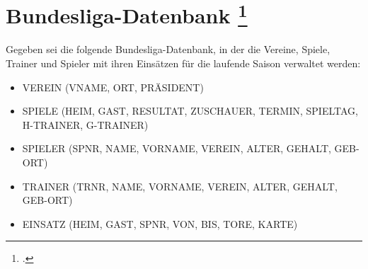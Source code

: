 \documentclass{lehramt-informatik-aufgabe}
\begin{document}

\section{Bundesliga-Datenbank
\footcite[Aufgabe 4: Relationale Algebra und SQL]{db:ab:7}}

Gegeben sei die folgende Bundesliga-Datenbank, in der die Vereine,
Spiele, Trainer und Spieler mit ihren Einsätzen für die laufende Saison
verwaltet werden:

\begin{itemize}
\item VEREIN (VNAME, ORT, PRÄSIDENT)
\item SPIELE (HEIM, GAST, RESULTAT, ZUSCHAUER, TERMIN, SPIELTAG, H-TRAINER,
G-TRAINER)
\item SPIELER (SPNR, NAME, VORNAME, VEREIN, ALTER, GEHALT, GEB-ORT)
\item TRAINER (TRNR, NAME, VORNAME, VEREIN, ALTER, GEHALT, GEB-ORT)
\item EINSATZ (HEIM, GAST, SPNR, VON, BIS, TORE, KARTE)
\end{itemize}
\end{document}
